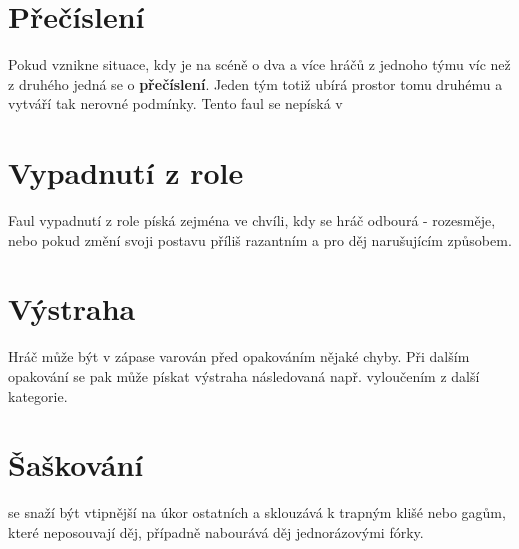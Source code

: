  
\needspace{5cm} \section{Přečíslení} \label{přečíslení}  
 
Pokud vznikne situace, kdy je na scéně o dva a více hráčů z jednoho týmu víc než z druhého jedná se o \textbf{přečíslení}{}. Jeden tým totiž ubírá prostor tomu druhému a vytváří tak nerovné podmínky. Tento faul se nepíská v  
 
 
\needspace{5cm} \section{Vypadnutí z role} \label{vypadnutí z role}  
 
Faul vypadnutí z role píská  zejména ve chvíli, kdy se hráč odbourá - rozesměje,  
nebo pokud změní svoji postavu příliš razantním a pro děj narušujícím způsobem. 
 
\needspace{5cm} \section{Výstraha} \label{výstraha}  
 
Hráč může být v zápase varován před opakováním nějaké chyby.  
Při dalším opakování se pak může pískat výstraha následovaná např. vyloučením z další kategorie. 
 
 
 
 
\needspace{5cm} \section{Šaškování} \label{šaškování}  
 
 se snaží být vtipnější na úkor ostatních a sklouzává k trapným klišé nebo gagům, které neposouvají děj, případně nabourává děj jednorázovými fórky. 
 
 
